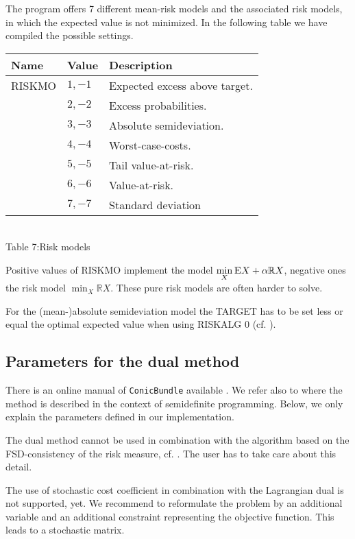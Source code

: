 \documentclass[11pt,draft]{article}
\newcommand{\expect}{{\textsc{E}}} %
\newcommand{\E}{{\expect}} %
\newcommand{\+}{{\ti{+}}}
\newcommand{\1}{{\ti{1}}}
\newcommand{\R}{\mathbb{R}}
\begin{document}
The program offers 7 different mean-risk models and the associated risk models, in which the expected
value is not minimized. In the following table we have compiled the possible settings.
%
\begin{center}
\begin{tabular}{|lll|} 
\hline
Name&Value&Description\\ \hline
RISKMO&$1,-1$&Expected excess above target.\\[0.2em]
&$2,-2$&Excess probabilities.\\[0.2em]
&$3,-3$&Absolute semideviation.\\[0.2em]
&$4,-4$&Worst-case-costs.\\[0.2em]
&$5,-5$&Tail value-at-risk.\\[0.2em]
&$6,-6$&Value-at-risk.\\[0.2em]
&$7,-7$&Standard deviation\\
\hline
\end{tabular}
\\[0.5em]{Table 7:\quad Risk models}
\end{center} %

Positive values of RISKMO implement the model $\min_X \limits \E X + \alpha \R X$, negative ones
the risk model $\min_X \limits \R X$. These pure risk models are often harder to solve.

For the (mean-)absolute semideviation model the TARGET has to be set less or equal the optimal expected value when using RISKALG 0 (cf. \cite{diss}).
%
\subsection{Parameters for the dual method} \label{SS:DUAL}
There is an online manual of \texttt{ConicBundle} available \cite{CB}. We refer also
to \cite{helm2} where the method is described in the context of semidefinite programming.
Below, we only explain the parameters defined in our implementation.

The dual method cannot be used in combination with the algorithm based on the FSD-consistency of the
risk measure, cf. \cite{diss}. The user has to take care about this detail. 

The use of stochastic cost coefficient in combination with the Lagrangian dual is not supported,
yet. We recommend to reformulate the problem by an additional variable and an additional constraint
representing the objective function. This leads to a stochastic matrix. 
\end{document}
